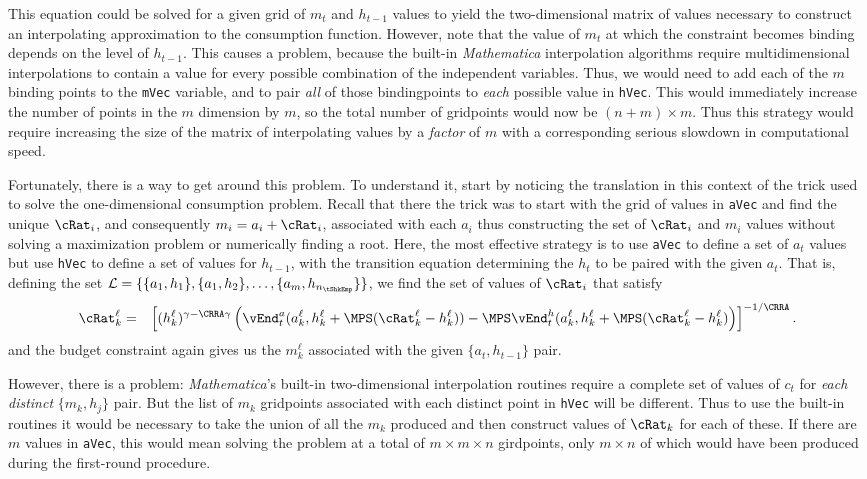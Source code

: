 \documentclass[titlepage]{\econtex}
\newcommand{\Mma}{\textit{Mathematica}}
\begin{document}
{This equation could be solved for a given grid of ${m}_{t}$ and
$h_{t-1}$ values to yield the two-dimensional matrix of values
necessary to construct an interpolating approximation to the
consumption function.  However, note that the value of ${m}_{t}$ at
which the constraint becomes binding depends on the level of
$h_{t-1}$.  This causes a problem, because the built-in {\Mma}
interpolation algorithms require multidimensional interpolations to
contain a value for every possible combination of the independent
variables.  Thus, we would need to add each of the $m$ binding
points to the \texttt{mVec} variable, and to pair \textit{all} of
those bindingpoints to \textit{each} possible value in \texttt{hVec}.
This would immediately increase the number of points in the ${m}$
dimension by $m$, so the total number of gridpoints would now be
$(n+m) \times m$.  Thus this strategy would require increasing the
size of the matrix of interpolating values by a \textit{factor} of $m$
with a corresponding serious slowdown in computational speed.

Fortunately, there is a way to get around this problem.  To
understand it, start by noticing the translation in this context of
the trick used to solve the one-dimensional consumption problem.
Recall that there the trick was to start with the grid of values in
\texttt{aVec} and find the unique ${\cRat}_{i}$, and
consequently ${m}_{i}={a}_{i}+{\cRat}_{i}$, associated with
each ${a}_{i}$ thus constructing the set of ${\cRat}_{i}$ and
${m}_{i}$ values without solving a maximization problem or
numerically finding a root.  Here, the most effective strategy is to
use \texttt{aVec} to define a set of ${a}_{t}$ values but use
\texttt{hVec} to define a set of values for $h_{t-1}$, with the
transition equation determining the $h_{t}$ to be paired with the
given ${a}_{t}$.  That is, defining the set $\mathcal{L} =
\{\{{a}_{1},h_{1}\},\{{a}_{1},h_{2}\},\ldots,\{{a}_{m},h_{n_{\tShkEmp}}\}\}$,
we find the set of values of ${\cRat}_{i}$ that satisfy
\begin{eqnarray}
  {\cRat}_{k}^{\ell} & = & \left[(h_{k}^{\ell})^{\gamma-\CRRA\gamma}
  \left(\vEnd_{t}^{{a}}({a}_{k}^{\ell},h_{k}^{\ell}
  +\MPS({\cRat}_{k}^{\ell}-h_{k}^{\ell}))
  -\MPS
  \vEnd_{t}^{h}({a}_{k}^{\ell},h_{k}^{\ell}+\MPS({\cRat}_{k}^{\ell}-h_{k}^{\ell})\right)
  \right]^{-1/\CRRA}. \nonumber
\end{eqnarray}
and the budget constraint again gives us the ${m}_{k}^{\ell}$
associated with the given $\{{a}_{t},h_{t-1}\}$ pair.

However, there is a problem: {\Mma}'s built-in two-dimensional
interpolation routines require a complete set of values of ${c}_{t}$
for \textit{each distinct} $\{{m}_{k},h_{j}\}$ pair.  But the list of
${m}_{k}$ gridpoints associated with each distinct point in
\texttt{hVec} will be different.  Thus to use the built-in routines
it would be necessary to take the union of all the ${m}_{k}$
produced and then construct values of ${\cRat}_{k}$ for each of
these.  If there are $m$ values in \texttt{aVec}, this would
mean solving the problem at a total of $m \times m \times n$
girdpoints, only $m \times n$ of which would have been produced
during the first-round procedure.

}
\end{document}
